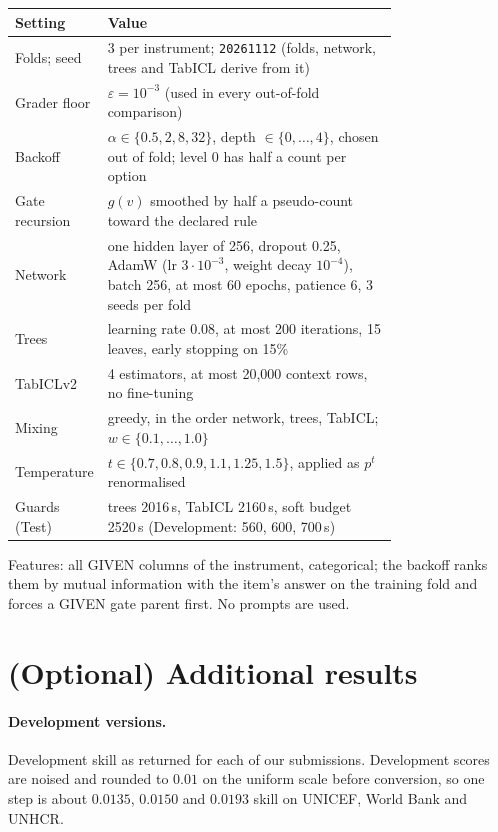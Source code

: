 \documentclass{article}
\begin{document}
\begin{table}[h]
  \centering
  \small
  \begin{tabular}{@{}lp{0.76\linewidth}@{}}
    \toprule
    Setting & Value \\
    \midrule
    Folds; seed & 3 per instrument; \texttt{20261112} (folds, network, trees and TabICL derive from it) \\
    Grader floor & $\varepsilon = 10^{-3}$ (used in every out-of-fold comparison) \\
    Backoff & $\alpha \in \{0.5, 2, 8, 32\}$, depth $\in \{0,\dots,4\}$, chosen out of fold; level 0 has half a count per option \\
    Gate recursion & $g(v)$ smoothed by half a pseudo-count toward the declared rule \\
    Network & one hidden layer of 256, dropout 0.25, AdamW (lr $3\cdot10^{-3}$, weight decay $10^{-4}$), batch 256, at most 60 epochs, patience 6, 3 seeds per fold \\
    Trees & learning rate 0.08, at most 200 iterations, 15 leaves, early stopping on 15\% \\
    TabICLv2 & 4 estimators, at most 20{,}000 context rows, no fine-tuning \\
    Mixing & greedy, in the order network, trees, TabICL; $w \in \{0.1, \dots, 1.0\}$ \\
    Temperature & $t \in \{0.7, 0.8, 0.9, 1.1, 1.25, 1.5\}$, applied as $p^t$ renormalised \\
    Guards (Test) & trees 2016\,s, TabICL 2160\,s, soft budget 2520\,s (Development: 560, 600, 700\,s) \\
    \bottomrule
  \end{tabular}
\end{table}

\noindent Features: all GIVEN columns of the instrument, categorical; the backoff
ranks them by mutual information with the item's answer on the training fold
and forces a GIVEN gate parent first. No prompts are used.

\section{(Optional) Additional results}
\label{app:results}

\paragraph{Development versions.} Development skill as returned for each of our
submissions. Development scores are noised and rounded to $0.01$ on the uniform
scale before conversion, so one step is about $0.0135$, $0.0150$ and $0.0193$
skill on UNICEF, World Bank and UNHCR.
\end{document}
